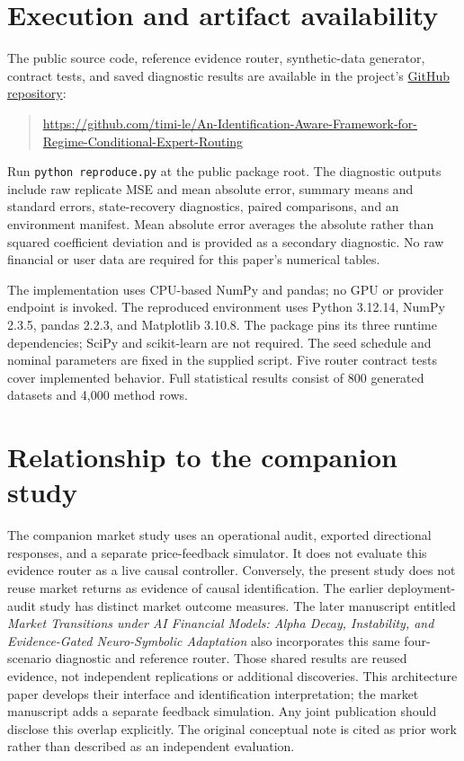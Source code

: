 \section{Execution and artifact availability}
The public source code, reference evidence router, synthetic-data generator, contract tests, and saved diagnostic results are available in the project's \href{https://github.com/timi-le/An-Identification-Aware-Framework-for-Regime-Conditional-Expert-Routing}{GitHub repository}:
\begin{quote}\small\raggedright\def\UrlBreaks{\do\/\do-}
\url{https://github.com/timi-le/An-Identification-Aware-Framework-for-Regime-Conditional-Expert-Routing}
\end{quote}

Run \texttt{python reproduce.py} at the public package root. The diagnostic outputs include raw replicate MSE and mean absolute error, summary means and standard errors, state-recovery diagnostics, paired comparisons, and an environment manifest. Mean absolute error averages the absolute rather than squared coefficient deviation and is provided as a secondary diagnostic. No raw financial or user data are required for this paper's numerical tables.

The implementation uses CPU-based NumPy and pandas; no GPU or provider endpoint is invoked. The reproduced environment uses Python 3.12.14, NumPy 2.3.5, pandas 2.2.3, and Matplotlib 3.10.8. The package pins its three runtime dependencies; SciPy and scikit-learn are not required. The seed schedule and nominal parameters are fixed in the supplied script. Five router contract tests cover implemented behavior. Full statistical results consist of 800 generated datasets and 4,000 method rows.

\section{Relationship to the companion study}
The companion market study uses an operational audit, exported directional responses, and a separate price-feedback simulator. It does not evaluate this evidence router as a live causal controller. Conversely, the present study does not reuse market returns as evidence of causal identification. The earlier deployment-audit study has distinct market outcome measures. The later manuscript entitled \emph{Market Transitions under AI Financial Models: Alpha Decay, Instability, and Evidence-Gated Neuro-Symbolic Adaptation} also incorporates this same four-scenario diagnostic and reference router. Those shared results are reused evidence, not independent replications or additional discoveries. This architecture paper develops their interface and identification interpretation; the market manuscript adds a separate feedback simulation. Any joint publication should disclose this overlap explicitly. The original conceptual note is cited as prior work rather than described as an independent evaluation.

